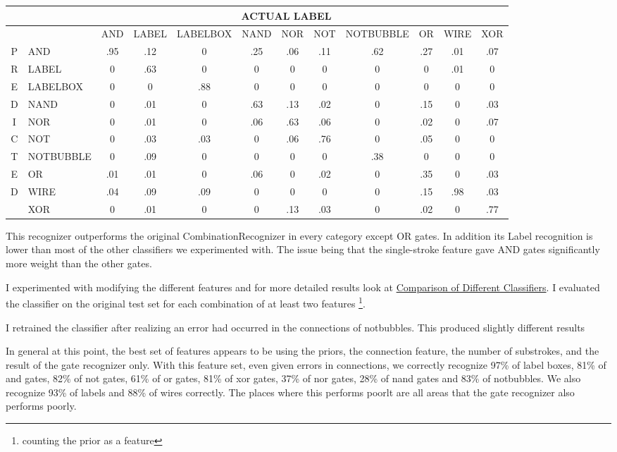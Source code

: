 \documentclass{article}
\begin{document}
\begin{tabular}{|c|l|c|c|c|c|c|c|c|c|c|c|}
\hline
&&\multicolumn{9}{c}{ACTUAL LABEL}\\
\hline
&&\tiny{AND}&\tiny{LABEL}&\tiny{LABELBOX}&\tiny{NAND}&\tiny{NOR}&\tiny{NOT}&\tiny{NOTBUBBLE}&\tiny{OR}&\tiny{WIRE}&\tiny{XOR}\\
\hline
P&\tiny{AND}&.95&.12&0&.25&.06&.11&.62&.27&.01&.07\\
R&\tiny{LABEL}&0&.63&0&0&0&0&0&0&.01&0\\
E&\tiny{LABELBOX}&0&0&.88&0&0&0&0&0&0&0\\
D&\tiny{NAND}&0&.01&0&.63&.13&.02&0&.15&0&.03\\
I&\tiny{NOR}&0&.01&0&.06&.63&.06&0&.02&0&.07\\
C&\tiny{NOT}&0&.03&.03&0&.06&.76&0&.05&0&0\\
T&\tiny{NOTBUBBLE}&0&.09&0&0&0&0&.38&0&0&0\\
E&\tiny{OR}&.01&.01&0&.06&0&.02&0&.35&0&.03\\
D&\tiny{WIRE}&.04&.09&.09&0&0&0&0&.15&.98&.03\\
&\tiny{XOR}&0&.01&0&0&.13&.03&0&.02&0&.77\\
\hline
\end{tabular}
\newline

This recognizer outperforms the original CombinationRecognizer in every category except OR gates.  In addition its Label recognition is lower than most of the other classifiers we experimented with.  The issue being that the single-stroke feature gave AND gates significantly more weight than the other gates.  

I experimented with modifying the different features and for more detailed results look at \href{https://www.cs.hmc.edu/twiki/bin/view/Sketchers/ComparisonOfRecognizers}{Comparison of Different Classifiers}.
I evaluated the classifier on the original test set for each combination of at least two features \footnote{counting the prior as a feature}.  

I retrained the classifier after realizing an error had occurred in the connections of notbubbles.  This produced slightly different results 

In general at this point, the best set of features appears to be using the priors, the connection feature, the number of substrokes, and the result of the gate recognizer only. With this feature set, even given errors in connections, we correctly recognize 97\% of label boxes, 81\% of and gates, 82\% of not gates, 61\% of or gates, 81\% of xor gates, 37\% of nor gates, 28\% of nand gates and 83\% of notbubbles.  We also recognize 93\% of labels and 88\% of wires correctly.  The places where this performs poorlt are all areas that the gate recognizer also performs poorly.
\end{document}

